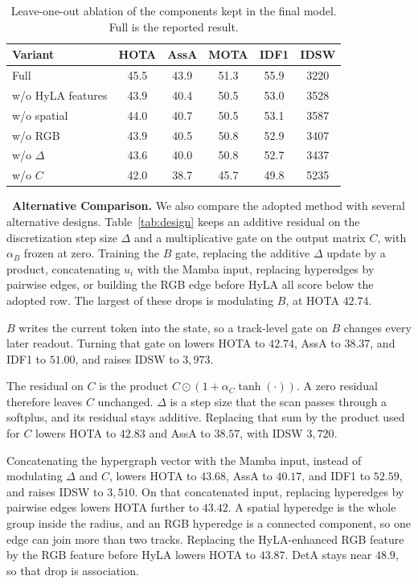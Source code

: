 \documentclass[10pt,twocolumn,letterpaper]{article}
\begin{document}
\begin{table}
  \centering
  \small
  \setlength{\tabcolsep}{2.8pt}
  \caption{Leave-one-out ablation of the components kept in the final model. Full is the reported result.}
  \label{tab:ablate}
  \begin{tabular}{lccccc}
    \toprule
    Variant & HOTA & AssA & MOTA & IDF1 & IDSW \\
    \midrule
    \rowcolor{oursrow}
    Full & 45.5 & 43.9 & 51.3 & 55.9 & 3220 \\
    w/o HyLA features & 43.9 & 40.4 & 50.5 & 53.0 & 3528 \\
    w/o spatial & 44.0 & 40.7 & 50.5 & 53.1 & 3587 \\
    w/o RGB & 43.9 & 40.5 & 50.8 & 52.9 & 3407 \\
    w/o $\Delta$ & 43.6 & 40.0 & 50.8 & 52.7 & 3437 \\
    w/o $C$ & 42.0 & 38.7 & 45.7 & 49.8 & 5235 \\
    \bottomrule
  \end{tabular}
\end{table}

\noindent\textbullet~\textbf{Alternative Comparison.} We also compare the adopted method with several alternative designs. Table~\ref{tab:design} keeps an additive residual on the discretization step size $\Delta$ and a multiplicative gate on the output matrix $C$, with $\alpha_B$ frozen at zero. Training the $B$ gate, replacing the additive $\Delta$ update by a product, concatenating $u_i$ with the Mamba input, replacing hyperedges by pairwise edges, or building the RGB edge before HyLA all score below the adopted row. The largest of these drops is modulating $B$, at HOTA $42.74$.

$B$ writes the current token into the state, so a track-level gate on $B$ changes every later readout. Turning that gate on lowers HOTA to $42.74$, AssA to $38.37$, and IDF1 to $51.00$, and raises IDSW to $3{,}973$.

The residual on $C$ is the product $C\odot(1+\alpha_C\tanh(\cdot))$. A zero residual therefore leaves $C$ unchanged. $\Delta$ is a step size that the scan passes through a softplus, and its residual stays additive. Replacing that sum by the product used for $C$ lowers HOTA to $42.83$ and AssA to $38.57$, with IDSW $3{,}720$.

Concatenating the hypergraph vector with the Mamba input, instead of modulating $\Delta$ and $C$, lowers HOTA to $43.68$, AssA to $40.17$, and IDF1 to $52.59$, and raises IDSW to $3{,}510$. On that concatenated input, replacing hyperedges by pairwise edges lowers HOTA further to $43.42$. A spatial hyperedge is the whole group inside the radius, and an RGB hyperedge is a connected component, so one edge can join more than two tracks. Replacing the HyLA-enhanced RGB feature by the RGB feature before HyLA lowers HOTA to $43.87$. DetA stays near $48.9$, so that drop is association.
\end{document}
